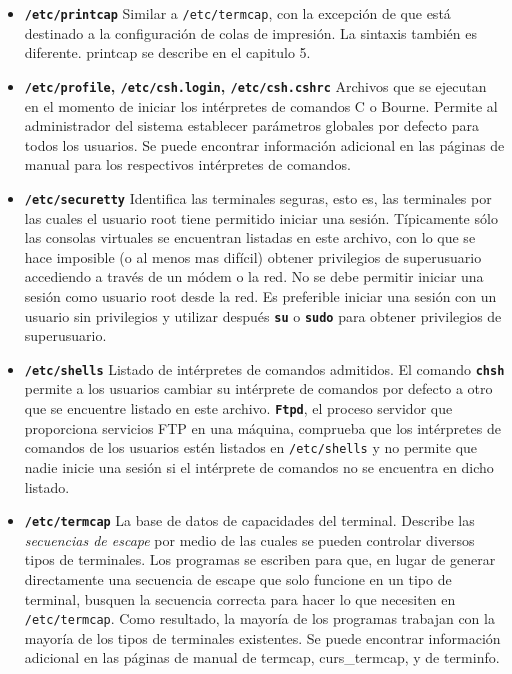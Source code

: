 \begin{itemize}
	
	\item \textbf{\texttt{/etc/printcap}}
	 Similar a \texttt{/etc/termcap}, con la
	excepción de que está destinado a la configuración de colas de
	impresión. La sintaxis también es diferente.  printcap se describe en el
	capitulo 5.   
	

	
	\item \textbf{\texttt{/etc/profile},
	\texttt{/etc/csh.login},
	\texttt{/etc/csh.cshrc}}  Archivos
	que se ejecutan en el momento de iniciar los intérpretes de comandos C o
	Bourne. Permite al administrador del sistema establecer parámetros
	globales por defecto para todos los usuarios. Se puede encontrar
	información adicional 	en las páginas de manual para los respectivos
	intérpretes de comandos.  



	\item \textbf{\texttt{/etc/securetty}}
	 Identifica las terminales seguras, esto es, las
	terminales por las cuales el usuario root tiene permitido iniciar una
	sesión. Típicamente sólo las consolas virtuales se encuentran listadas
	en este archivo, con lo que se hace imposible (o al menos mas difícil)
	obtener privilegios de superusuario accediendo a través de un módem o la
	red. No se debe permitir iniciar una sesión como usuario root desde la
	red. Es preferible iniciar una sesión con un usuario sin privilegios y
	utilizar después \texttt{\textbf{su}} o \texttt{\textbf{sudo}} para
	obtener privilegios de superusuario.  



	\item \textbf{\texttt{/etc/shells}}
	 Listado de intérpretes de comandos admitidos.  El
	comando \texttt{\textbf{chsh}} permite a los usuarios cambiar su
	intérprete de comandos por defecto a otro que se encuentre listado en
	este archivo. \texttt{\textbf{Ftpd}}, el proceso servidor que
	proporciona 	servicios FTP en una máquina, comprueba que los
	intérpretes de comandos 		de los usuarios estén listados
	en \texttt{/etc/shells} y no 		permite que
	nadie inicie una sesión si el intérprete de comandos no se encuentra en
	dicho listado.  

	
	\item \textbf{\texttt{/etc/termcap}}
	 La base de datos de capacidades del terminal. Describe
	las \textit{secuencias de escape} por medio de 		las
	cuales se pueden controlar diversos tipos de terminales. Los programas
	se escriben para que, en lugar de generar directamente una secuencia de
	escape que solo funcione en un tipo de terminal, busquen la secuencia
	correcta para hacer lo que necesiten en
	\texttt{/etc/termcap}. 		Como resultado, la
	mayoría de los programas trabajan con la mayoría de los
	tipos de terminales existentes. Se puede encontrar información adicional
	en 	las páginas de manual de termcap, curs\_termcap, y de terminfo.
	

 \end{itemize} 
    



